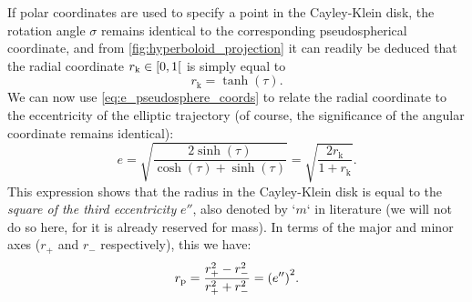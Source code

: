 If polar coordinates are used to specify a point in the Cayley-Klein disk, the rotation angle \(\sigma\) remains identical to the corresponding pseudospherical coordinate, and from \cref{fig:hyperboloid_projection} it can readily be deduced that the radial coordinate \(r_\text{k} \in \interval[open right]{0}{1}\) is simply equal to
\begin{equation}
    r_\text{k} = \tanh(\tau).
\end{equation}
We can now use \cref{eq:e_pseudosphere_coords} to relate the radial coordinate to the eccentricity of the elliptic trajectory (of course, the significance of the angular coordinate remains identical):
\begin{equation}
    e = \sqrt{\frac{2\sinh(\tau)}{\cosh(\tau) + \sinh(\tau)}} = \sqrt{\frac{2r_\text{k}}{1 + r_\text{k}}}. 
\end{equation}
This expression shows that the radius in the Cayley-Klein disk is equal to the \emph{square of the third eccentricity} \(e''\), also denoted by `\(m\)` in literature (we will not do so here, for it is already reserved for mass). In terms of the major and minor axes (\(r_+\) and \(r_-\) respectively), this we have: \cite{Rapp1991}
\begin{equation}
    r_\text{p} = \frac{r_+^2 - r_-^2}{r_+^2 + r_-^2} = \qty(e'')^2.
    \label{eq:eccentricity_cayley}
\end{equation}

